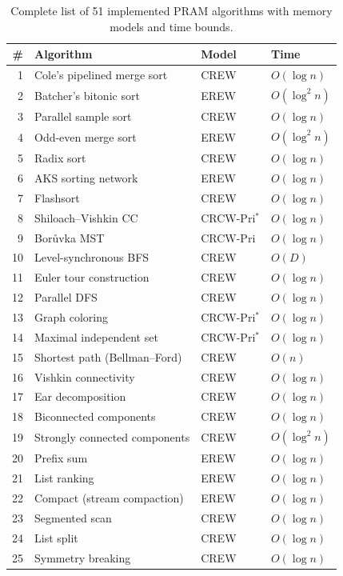 \documentclass[11pt]{article}
\begin{document}
\begin{table}[p]
\centering
\caption{Complete list of 51 implemented PRAM algorithms with memory models
  and time bounds.}
\label{tab:fullcatalog}
\scriptsize
\begin{tabular}{@{}rlll@{}}
\toprule
\textbf{\#} & \textbf{Algorithm} & \textbf{Model} & \textbf{Time} \\
\midrule
1 & Cole's pipelined merge sort & CREW & $O(\log n)$ \\
2 & Batcher's bitonic sort & EREW & $O(\log^2 n)$ \\
3 & Parallel sample sort & CREW & $O(\log n)$ \\
4 & Odd-even merge sort & EREW & $O(\log^2 n)$ \\
5 & Radix sort & CREW & $O(\log n)$ \\
6 & AKS sorting network & EREW & $O(\log n)$ \\
7 & Flashsort & CREW & $O(\log n)$ \\
\midrule
8 & Shiloach--Vishkin CC & CRCW-Pri$^*$ & $O(\log n)$ \\
9 & Bor\r{u}vka MST & CRCW-Pri & $O(\log n)$ \\
10 & Level-synchronous BFS & CREW & $O(D)$ \\
11 & Euler tour construction & CREW & $O(\log n)$ \\
12 & Parallel DFS & CREW & $O(\log n)$ \\
13 & Graph coloring & CRCW-Pri$^*$ & $O(\log n)$ \\
14 & Maximal independent set & CRCW-Pri$^*$ & $O(\log n)$ \\
15 & Shortest path (Bellman--Ford) & CREW & $O(n)$ \\
\midrule
16 & Vishkin connectivity & CREW & $O(\log n)$ \\
17 & Ear decomposition & CREW & $O(\log n)$ \\
18 & Biconnected components & CREW & $O(\log n)$ \\
19 & Strongly connected components & CREW & $O(\log^2 n)$ \\
\midrule
20 & Prefix sum & EREW & $O(\log n)$ \\
21 & List ranking & EREW & $O(\log n)$ \\
22 & Compact (stream compaction) & EREW & $O(\log n)$ \\
23 & Segmented scan & CREW & $O(\log n)$ \\
24 & List split & CREW & $O(\log n)$ \\
25 & Symmetry breaking & CREW & $O(\log n)$ \\

\end{tabular}
\end{table}
\end{document}
